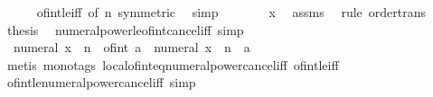 \begin{isabellebody}
\ \ \ \ \isamarkupfalse%
\ of{\isacharunderscore}{\kern0pt}int{\isacharunderscore}{\kern0pt}{}{\isacharunderscore}{\kern0pt}le{\isacharunderscore}{\kern0pt}iff\ {\isacharbrackleft}{\kern0pt}of\ {\isachardoublequoteopen}{\isasymbar}n{\isasymbar}{\isachardoublequoteclose}{\isacharcomma}{\kern0pt}\ symmetric{\isacharbrackright}{\kern0pt}\ \isamarkupfalse%
\ simp\isanewline
\ \ \isamarkupfalse%
\ \isamarkupfalse%
\ {\isachardoublequoteopen}{}\ {\isasymle}\ x{\isachardoublequoteclose}\ \isamarkupfalse%
\ assms\ \isamarkupfalse%
\ {\isacharparenleft}{\kern0pt}rule\ order{\isacharunderscore}{\kern0pt}trans{\isacharparenright}{\kern0pt}\isanewline
\ \ \isamarkupfalse%
\ \isamarkupfalse%
\ {\isacharquery}{\kern0pt}thesis\ \isacommand{{\isachardot}{\kern0pt}{\isachardot}{\kern0pt}}\isamarkupfalse%
\isanewline
{}\isamarkupfalse%
%
\endisatagproof
{\isafoldproof}%
%
\isadelimproof
\isanewline
%
\endisadelimproof
\isanewline
{}\isamarkupfalse%
\ numeral{\isacharunderscore}{\kern0pt}power{\isacharunderscore}{\kern0pt}le{\isacharunderscore}{\kern0pt}of{\isacharunderscore}{\kern0pt}int{\isacharunderscore}{\kern0pt}cancel{\isacharunderscore}{\kern0pt}iff\ {\isacharbrackleft}{\kern0pt}simp{\isacharbrackright}{\kern0pt}{\isacharcolon}{\kern0pt}\isanewline
\ \ {\isachardoublequoteopen}numeral\ x\ {\isacharcircum}{\kern0pt}\ n\ {\isasymle}\ of{\isacharunderscore}{\kern0pt}int\ a\ {\isasymlongleftrightarrow}\ numeral\ x\ {\isacharcircum}{\kern0pt}\ n\ {\isasymle}\ a{\isachardoublequoteclose}\isanewline
%
\isadelimproof
\ \ %
\endisadelimproof
%
\isatagproof
{}\isamarkupfalse%
\ {\isacharparenleft}{\kern0pt}metis\ {\isacharparenleft}{\kern0pt}mono{\isacharunderscore}{\kern0pt}tags{\isacharparenright}{\kern0pt}\ local{\isachardot}{\kern0pt}of{\isacharunderscore}{\kern0pt}int{\isacharunderscore}{\kern0pt}eq{\isacharunderscore}{\kern0pt}numeral{\isacharunderscore}{\kern0pt}power{\isacharunderscore}{\kern0pt}cancel{\isacharunderscore}{\kern0pt}iff\ of{\isacharunderscore}{\kern0pt}int{\isacharunderscore}{\kern0pt}le{\isacharunderscore}{\kern0pt}iff{\isacharparenright}{\kern0pt}%
\endisatagproof
{\isafoldproof}%
%
\isadelimproof
\isanewline
%
\endisadelimproof
\isanewline
{}\isamarkupfalse%
\ of{\isacharunderscore}{\kern0pt}int{\isacharunderscore}{\kern0pt}le{\isacharunderscore}{\kern0pt}numeral{\isacharunderscore}{\kern0pt}power{\isacharunderscore}{\kern0pt}cancel{\isacharunderscore}{\kern0pt}iff\ {\isacharbrackleft}{\kern0pt}simp{\isacharbrackright}{\kern0pt}{\isacharcolon}{\kern0pt}\isanewline

\end{isabellebody}
